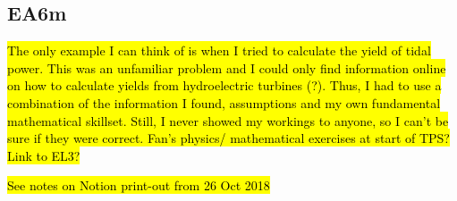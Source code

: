 \subsection*{EA6m}

\hl{The only example I can think of is when I tried to calculate the yield of tidal power. This was an unfamiliar problem and I could only find information online on how to calculate yields from hydroelectric turbines (?). Thus, I had to use a combination of the information I found, assumptions and my own fundamental mathematical skillset. Still, I never showed my workings to anyone, so I can't be sure if they were correct. Fan's physics/ mathematical exercises at start of TPS? Link to EL3?}

\hl{See notes on Notion print-out from 26 Oct 2018}

